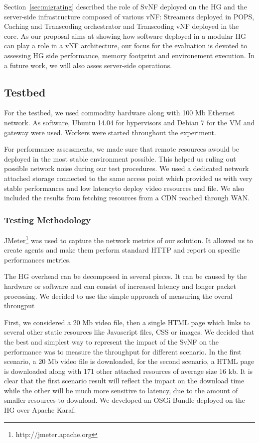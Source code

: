 Section~\ref{sec:migrating} described the role of SvNF deployed on the HG and the server-side infrastructure composed of various vNF: Streamers deployed in POPS, Caching and Transcoding orchestrator and Transcoding vNF deployed in the core.
As our proposal aims at showing how software deployed in a modular HG can play a role in a vNF architecture, our focus for the evaluation is devoted to assessing HG side performance, memory footprint and environement execution. In a future work, we will also asses server-side operations.


\subsection{Testbed}

For the testbed, we used commodity hardware along with 100 Mb Ethernet network. As software, Ubuntu 14.04 for hypervisors and Debian 7 for the VM and gateway were used. Workers were started throughout the experiment.
  
For performance assessments, we made sure that remote resources awould be deployed in the most stable environment possible. This helped us ruling out possible network noise during our test procedures. We used a dedicated network attached storage connected to the same access point which provided us with very stable performances and low latencyto deploy video resources and file. We also included the results from fetching resources from a CDN reached through WAN.

 \subsubsection{Testing Methodology}
JMeter\footnote{http://jmeter.apache.org} was used to capture the network metrics of our solution.
It allowed us to create agents and make them perform standard HTTP and report on specific performances metrics.    

The HG overhead can be decomposed in several pieces.
It can be caused by the hardware or software and can consist of increased latency and longer packet processing.
We decided to use the simple approach of measuring the overal througput 

First, we considered a 20 Mb video file, then a single HTML page which links to several other static resources like Javascript files, CSS or images. 
We decided that the best and simplest way to represent the impact of the SvNF on the performance was to measure the throughput for different scenario. In the first scenario, a 20 Mb video file is downloaded, for the second scenario, a HTML page is downloaded along with 171 other attached resources of average size 16 kb. It is clear that the first scenario result will reflect the impact on the download time while the other will be much more sensitive to latency, due to the amount of smaller resources to download.
We developed an OSGi Bundle deployed on the HG over Apache Karaf.

